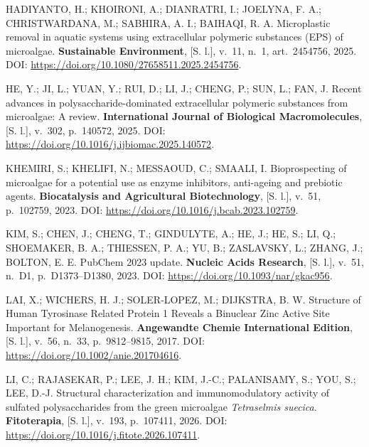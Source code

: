 \begin{samepage}
\filbreak\hypertarget{cite.0@hadiyanto2025}{}HADIYANTO, H.; KHOIRONI, A.; DIANRATRI, I.; JOELYNA, F. A.; CHRISTWARDANA, M.; SABHIRA, A. I.; BAIHAQI, R. A. Microplastic removal in aquatic systems using extracellular polymeric substances (EPS) of microalgae. \textbf{Sustainable Environment}, [S. l.], v.~11, n.~1, art.~2454756, 2025. DOI: \url{https://doi.org/10.1080/27658511.2025.2454756}.
\end{samepage}

\begin{samepage}
\filbreak\hypertarget{cite.0@he2025}{}HE, Y.; JI, L.; YUAN, Y.; RUI, D.; LI, J.; CHENG, P.; SUN, L.; FAN, J. Recent advances in polysaccharide-dominated extracellular polymeric substances from microalgae: A review. \textbf{International Journal of Biological Macromolecules}, [S. l.], v.~302, p.~140572, 2025. DOI: \url{https://doi.org/10.1016/j.ijbiomac.2025.140572}.
\end{samepage}

\begin{samepage}
\filbreak\hypertarget{cite.0@khemiri2023}{}KHEMIRI, S.; KHELIFI, N.; MESSAOUD, C.; SMAALI, I. Bioprospecting of microalgae for a potential use as enzyme inhibitors, anti-ageing and prebiotic agents. \textbf{Biocatalysis and Agricultural Biotechnology}, [S. l.], v.~51, p.~102759, 2023. DOI: \url{https://doi.org/10.1016/j.bcab.2023.102759}.
\end{samepage}

\begin{samepage}
\filbreak\hypertarget{cite.0@pubchem2023}{}KIM, S.; CHEN, J.; CHENG, T.; GINDULYTE, A.; HE, J.; HE, S.; LI, Q.; SHOEMAKER, B. A.; THIESSEN, P. A.; YU, B.; ZASLAVSKY, L.; ZHANG, J.; BOLTON, E. E. PubChem 2023 update. \textbf{Nucleic Acids Research}, [S. l.], v.~51, n.~D1, p.~D1373--D1380, 2023. DOI: \url{https://doi.org/10.1093/nar/gkac956}.
\end{samepage}

\begin{samepage}
\filbreak\hypertarget{cite.0@lai2017}{}LAI, X.; WICHERS, H. J.; SOLER‐LOPEZ, M.; DIJKSTRA, B. W. Structure of Human Tyrosinase Related Protein 1 Reveals a Binuclear Zinc Active Site Important for Melanogenesis. \textbf{Angewandte Chemie International Edition}, [S. l.], v.~56, n.~33, p.~9812--9815, 2017. DOI: \url{https://doi.org/10.1002/anie.201704616}.
\end{samepage}

\begin{samepage}
\filbreak\hypertarget{cite.0@li2026tetraselmis}{}LI, C.; RAJASEKAR, P.; LEE, J. H.; KIM, J.-C.; PALANISAMY, S.; YOU, S.; LEE, D.-J. Structural characterization and immunomodulatory activity of sulfated polysaccharides from the green microalgae \textit{Tetraselmis suecica}. \textbf{Fitoterapia}, [S. l.], v.~193, p.~107411, 2026. DOI: \url{https://doi.org/10.1016/j.fitote.2026.107411}.
\end{samepage}

